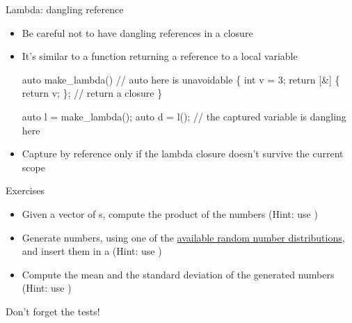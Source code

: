 \begin{frame}[fragile]{Lambda: dangling reference}

  \begin{itemize}
  \item Be careful not to have dangling references in a closure
  \item It's similar to a function returning a reference to a local variable

  \begin{codeblock}
auto make_lambda() // auto here is unavoidable
\{
  int v = 3;
  return [\alert{&}] \{ return v; \}; // return a closure
\}

auto l = make\_lambda();
auto d = l(); // the captured variable is dangling here\end{codeblock}

  \item<2-> Capture by reference only if the lambda closure doesn't survive the
    current scope
  \end{itemize}

\end{frame}

\begin{frame}{Exercises}

  \begin{itemize}
  \item Given a vector of s, compute the product of the numbers (Hint:
    use )
  \item Generate  numbers, using one of the
    \href{https://en.cppreference.com/w/cpp/named_req/RandomNumberDistribution}{available
      random number distributions}, and insert them in a  (Hint: use )
  \item Compute the mean and the standard deviation of the generated numbers
    (Hint: use )
  \end{itemize}

  Don't forget the tests!
\end{frame}

